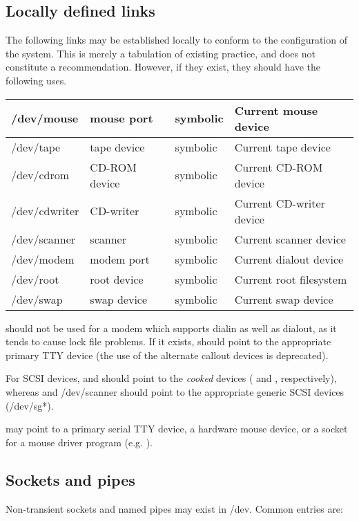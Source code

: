 \documentclass[a4paper,8pt,english]{sphinxmanual}
\begin{document}
\subsection{Locally defined links}
\label{admin-guide/devices:locally-defined-links}
The following links may be established locally to conform to the
configuration of the system.  This is merely a tabulation of existing
practice, and does not constitute a recommendation.  However, if they
exist, they should have the following uses.

\begin{tabulary}{\linewidth}{|L|L|L|L|}
\hline

/dev/mouse
 & 
mouse port
 & 
symbolic
 & 
Current mouse device
\\
\hline
/dev/tape
 & 
tape device
 & 
symbolic
 & 
Current tape device
\\
\hline
/dev/cdrom
 & 
CD-ROM device
 & 
symbolic
 & 
Current CD-ROM device
\\
\hline
/dev/cdwriter
 & 
CD-writer
 & 
symbolic
 & 
Current CD-writer device
\\
\hline
/dev/scanner
 & 
scanner
 & 
symbolic
 & 
Current scanner device
\\
\hline
/dev/modem
 & 
modem port
 & 
symbolic
 & 
Current dialout device
\\
\hline
/dev/root
 & 
root device
 & 
symbolic
 & 
Current root filesystem
\\
\hline
/dev/swap
 & 
swap device
 & 
symbolic
 & 
Current swap device
\\
\hline\end{tabulary}


 should not be used for a modem which supports dialin as
well as dialout, as it tends to cause lock file problems.  If it
exists,  should point to the appropriate primary TTY device
(the use of the alternate callout devices is deprecated).

For SCSI devices,  and  should point to the
\emph{cooked} devices ( and , respectively), whereas
 and /dev/scanner should point to the appropriate generic
SCSI devices (/dev/sg*).

 may point to a primary serial TTY device, a hardware mouse
device, or a socket for a mouse driver program (e.g. ).


\subsection{Sockets and pipes}
\label{admin-guide/devices:sockets-and-pipes}
Non-transient sockets and named pipes may exist in /dev.  Common entries are:
\end{document}

